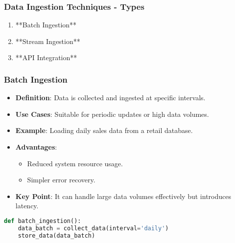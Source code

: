 \documentclass[aspectratio=169]{beamer}
\begin{document}
\begin{frame}[fragile]
    \frametitle{Data Ingestion Techniques - Types}
    \begin{enumerate}
        \item **Batch Ingestion**
        \item **Stream Ingestion**
        \item **API Integration**
    \end{enumerate}
\end{frame}

\begin{frame}[fragile]
    \frametitle{Batch Ingestion}
    \begin{itemize}
        \item \textbf{Definition}: Data is collected and ingested at specific intervals.
        \item \textbf{Use Cases}: Suitable for periodic updates or high data volumes.
        \item \textbf{Example}: Loading daily sales data from a retail database.
        \item \textbf{Advantages}:
            \begin{itemize}
                \item Reduced system resource usage.
                \item Simpler error recovery.
            \end{itemize}
        \item \textbf{Key Point}: It can handle large data volumes effectively but introduces latency.
    \end{itemize}
    \begin{lstlisting}[language=Python]
def batch_ingestion():
    data_batch = collect_data(interval='daily')
    store_data(data_batch)
    \end{lstlisting}
\end{frame}
\end{document}
